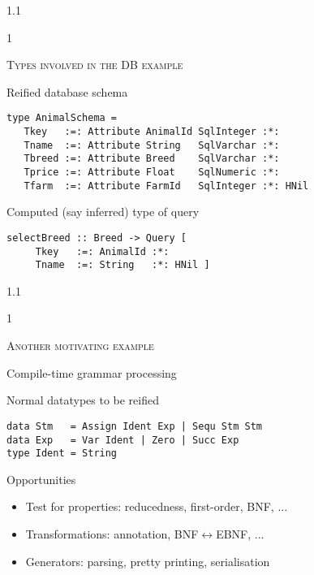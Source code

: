 \documentclass{slides}
\newcommand{\noskip}{\topsep0pt \parskip0pt \partopsep0pt}
\newcommand{\header}[1]{{\large\scshape \color{Red} #1} \medskip }
\newcommand{\blau}[1]{{\color{Blue} #1} \medskip }
\newenvironment{myslide}{\begin{slide}\color{Blue}\begin{boxedminipage}{1.1\hsize}\begin{boxedminipage}{1\hsize}\color{Black}
\vspace{-170\in}
}{%
\smallskip
\end{boxedminipage}
\end{boxedminipage}
\end{slide}}
\begin{document}



\begin{myslide}

\header{Types involved in the DB example}

\blau{Reified database schema}

\begin{Verbatim}[fontseries=normal,fontsize=\tiny]
type AnimalSchema =
   Tkey   :=: Attribute AnimalId SqlInteger :*:
   Tname  :=: Attribute String   SqlVarchar :*:
   Tbreed :=: Attribute Breed    SqlVarchar :*:
   Tprice :=: Attribute Float    SqlNumeric :*:
   Tfarm  :=: Attribute FarmId   SqlInteger :*: HNil
\end{Verbatim}

\blau{Computed (say inferred) type of query}

\begin{Verbatim}[fontseries=normal,fontsize=\tiny]
selectBreed :: Breed -> Query [
     Tkey   :=: AnimalId :*:
     Tname  :=: String   :*: HNil ]
\end{Verbatim}

\end{myslide}






\begin{myslide}

\header{Another motivating example}

Compile-time grammar processing

\bigskip

\blau{Normal datatypes to be reified}

\begin{Verbatim}[fontseries=normal,fontsize=\tiny]
data Stm   = Assign Ident Exp | Sequ Stm Stm
data Exp   = Var Ident | Zero | Succ Exp
type Ident = String
\end{Verbatim}

{\small

\blau{Opportunities}

\noskip\begin{itemize}
\item Test for properties: reducedness, first-order, BNF, ...
\item Transformations: annotation, BNF$\leftrightarrow$EBNF, ...
\item Generators: parsing, pretty printing, serialisation
\end{itemize}

}

\end{myslide}
\end{document}
